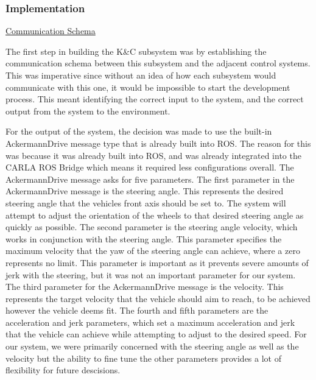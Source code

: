 \documentclass[titlepage,draft]{article}
\begin{document}
{\subsubsection{Implementation}
\underline{Communication Schema}

The first step in building the K\&C subsystem was by establishing the communication schema between this subsystem and the adjacent control systems. This was imperative since without an idea of how each subsystem would communicate with this one, it would be impossible to start the development process. This meant identifying the correct input to the system, and the correct output from the system to the environment.

For the output of the system, the decision was made to use the built-in AckermannDrive message type that is already built into ROS. The reason for this was because it was already built into ROS, and was already integrated into the CARLA ROS Bridge which means it required less configurations overall. The AckermannDrive message asks for five parameters. The first parameter in the AckermannDrive message is the steering angle. This represents the desired steering angle that the vehicles front axis should be set to. The system will attempt to adjust the orientation of the wheels to that desired steering angle as quickly as possible. The second parameter is the steering angle velocity, which works in conjunction with the steering angle. This parameter specifies the maximum velocity that the yaw of the steering angle can achieve, where a zero represents no limit. This parameter is important as it prevents severe amounts of jerk with the steering, but it was not an important parameter for our system. The third parameter for the AckermannDrive message is the velocity. This represents the target velocity that the vehicle should aim to reach, to be achieved however the vehicle deems fit. The fourth and fifth parameters are the acceleration and jerk parameters, which set a maximum acceleration and jerk that the vehicle can achieve while attempting to adjust to the desired speed. For our system, we were primarily concerned with the steering angle as well as the velocity but the ability to fine tune the other parameters provides a lot of flexibility for future descisions.

}
\end{document}
